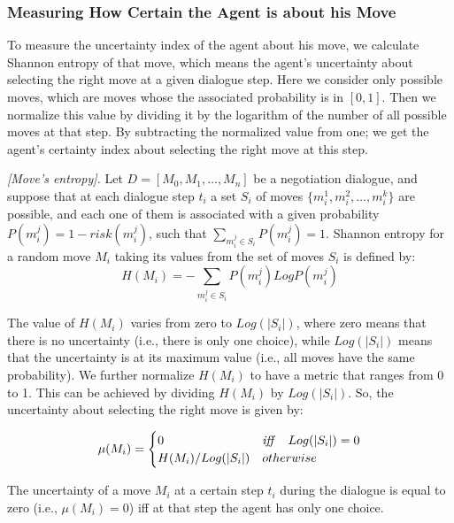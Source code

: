 \subsubsection{Measuring How Certain the Agent is about his Move}\label{moveuncertainty}
To measure the uncertainty index of the agent about his move, we calculate Shannon entropy of that move, which means the agent's
uncertainty about selecting the right move at a given dialogue step. Here we consider only possible moves, which are moves whose
the associated probability is in $[0,1]$. Then we normalize this value by dividing it by the logarithm of the number of all
possible moves at that step. By subtracting the normalized value from one; we get the agent's certainty index about selecting the
right move at this step.

\begin{definition}{\emph{[Move's entropy]. }} \label{Move'sentropy}
Let $D = [M_0, M_1, \ldots, M_n]$ be a negotiation dialogue, and suppose that at each dialogue step $t_i$ a set $S_i$ of moves
$\{m_i^1,m_i^2,\ldots,m_i^k\}$ are possible, and each one of them is associated with a given probability $P(m_i^j) = 1-risk(m_i^j)$,
such that $\sum_{m_i^j\in S_i} P(m_i^j)=1$. Shannon entropy for a random move $M_i$ taking its values from the set of moves $S_i$ is
defined by:
\begin{equation}\label{equation5}
H(M_i) = - \sum_{m_i^j\in S_i}P(m_i^j)Log P(m_i^j)
\end{equation}
\end{definition}

The value of $H(M_i)$ varies from zero to $Log(|S_i|)$, where zero means that there is no uncertainty (i.e., there is only one
choice), while $Log(|S_i|)$ means that the uncertainty is at its maximum value (i.e., all moves have the same probability). We
further normalize $H(M_i)$ to have a metric that ranges from 0 to 1. This can be achieved by dividing $H(M_i)$ by $Log(|S_i|)$. So,
the uncertainty about selecting the right move is given by:

\begin{equation}\label{equation6}
\mu(M_i)=
\begin{cases} 0 & \text{\emph{iff}}~~~Log(|S_i|)=0
\\
H(M_i)/Log(|S_i|) &otherwise
\end{cases}
\end{equation}

\begin{proposition} \label{proposition1}
The uncertainty of a move $M_i$ at a certain step $t_i$ during the dialogue is equal to zero (i.e., $\mu(M_i)=0$) iff at that step the
agent has only one choice.
\end{proposition}

